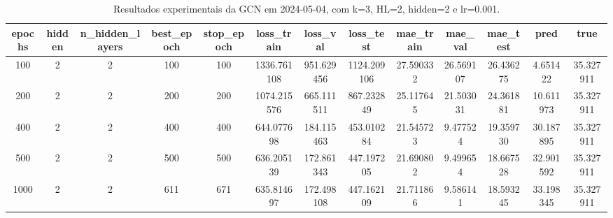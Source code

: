 \begin{table}[h]
\centering
\caption{Resultados experimentais da GCN em 2024-05-04, com k=3, HL=2, hidden=2 e lr=0.001.}
\label{tab:gcn_results_k3_hl2_h2_d20240504}
\begin{tabular}{ccccccccccccc}
\toprule
epochs & hidden & n\_hidden\_layers & best\_epoch & stop\_epoch & loss\_train & loss\_val & loss\_test & mae\_train & mae\_val & mae\_test & pred & true \\
\midrule
100 & 2 & 2 & 100 & 100 & 1336.761108 & 951.629456 & 1124.209106 & 27.590332 & 26.569107 & 26.436275 & 4.651422 & 35.327911 \\
200 & 2 & 2 & 200 & 200 & 1074.215576 & 665.111511 & 867.232849 & 25.117645 & 21.503031 & 24.361881 & 10.611973 & 35.327911 \\
400 & 2 & 2 & 400 & 400 & 644.077698 & 184.115463 & 453.010284 & 21.545723 & 9.477524 & 19.359730 & 30.187895 & 35.327911 \\
500 & 2 & 2 & 500 & 500 & 636.205139 & 172.861343 & 447.197205 & 21.690802 & 9.499654 & 18.667528 & 32.901592 & 35.327911 \\
1000 & 2 & 2 & 611 & 671 & 635.814697 & 172.498108 & 447.162109 & 21.711866 & 9.586141 & 18.593245 & 33.198345 & 35.327911 \\
\bottomrule
\end{tabular}
\end{table}
